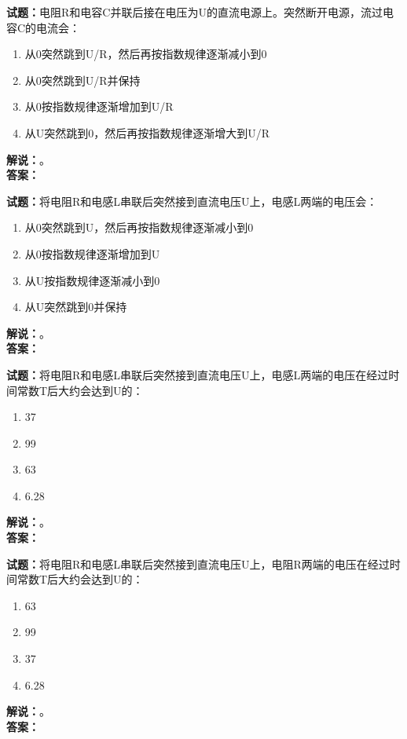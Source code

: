 \documentclass{ctexbook}
\begin{document}
\vspace{\baselineskip}

\noindent\textbf{试题：}电阻R和电容C并联后接在电压为U的直流电源上。突然断开电源，流过电容C的电流会：
\begin{enumerate}[leftmargin=3em]
  \item 从0突然跳到U/R，然后再按指数规律逐渐减小到0
  \item 从0突然跳到U/R并保持
  \item 从0按指数规律逐渐增加到U/R
  \item 从U突然跳到0，然后再按指数规律逐渐增大到U/R
\end{enumerate}
\noindent\textbf{解说：}\textbf{}。\\\noindent\textbf{答案：}

\vspace{\baselineskip}

\noindent\textbf{试题：}将电阻R和电感L串联后突然接到直流电压U上，电感L两端的电压会：
\begin{enumerate}[leftmargin=3em]
  \item 从0突然跳到U，然后再按指数规律逐渐减小到0
  \item 从0按指数规律逐渐增加到U
  \item 从U按指数规律逐渐减小到0
  \item 从U突然跳到0并保持
\end{enumerate}
\noindent\textbf{解说：}\textbf{}。\\\noindent\textbf{答案：}

\vspace{\baselineskip}

\noindent\textbf{试题：}将电阻R和电感L串联后突然接到直流电压U上，电感L两端的电压在经过时间常数T后大约会达到U的：
\begin{enumerate}[leftmargin=3em]
  \item 37%
  \item 99%
  \item 63%
  \item 6.28%
\end{enumerate}
\noindent\textbf{解说：}\textbf{}。\\\noindent\textbf{答案：}

\vspace{\baselineskip}

\noindent\textbf{试题：}将电阻R和电感L串联后突然接到直流电压U上，电阻R两端的电压在经过时间常数T后大约会达到U的：
\begin{enumerate}[leftmargin=3em]
  \item 63%
  \item 99%
  \item 37%
  \item 6.28%
\end{enumerate}
\noindent\textbf{解说：}\textbf{}。\\\noindent\textbf{答案：}
\end{document}
